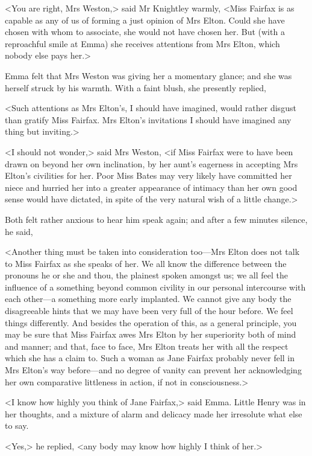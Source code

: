 <You are right, Mrs Weston,> said Mr Knightley warmly, <Miss Fairfax is as capable as any of us of forming a just opinion of Mrs Elton. Could she have chosen with whom to associate, she would not have chosen her. But (with a reproachful smile at Emma) she receives attentions from Mrs Elton, which nobody else pays her.>

Emma felt that Mrs Weston was giving her a momentary glance; and she was herself struck by his warmth. With a faint blush, she presently replied,

<Such attentions as Mrs Elton's, I should have imagined, would rather disgust than gratify Miss Fairfax. Mrs Elton's invitations I should have imagined any thing but inviting.>

<I should not wonder,> said Mrs Weston, <if Miss Fairfax were to have been drawn on beyond her own inclination, by her aunt's eagerness in accepting Mrs Elton's civilities for her. Poor Miss Bates may very likely have committed her niece and hurried her into a greater appearance of intimacy than her own good sense would have dictated, in spite of the very natural wish of a little change.>

Both felt rather anxious to hear him speak again; and after a few minutes silence, he said,

<Another thing must be taken into consideration too—Mrs Elton does not talk to Miss Fairfax as she speaks of her. We all know the difference between the pronouns he or she and thou, the plainest spoken amongst us; we all feel the influence of a something beyond common civility in our personal intercourse with each other—a something more early implanted. We cannot give any body the disagreeable hints that we may have been very full of the hour before. We feel things differently. And besides the operation of this, as a general principle, you may be sure that Miss Fairfax awes Mrs Elton by her superiority both of mind and manner; and that, face to face, Mrs Elton treats her with all the respect which she has a claim to. Such a woman as Jane Fairfax probably never fell in Mrs Elton's way before—and no degree of vanity can prevent her acknowledging her own comparative littleness in action, if not in consciousness.>

<I know how highly you think of Jane Fairfax,> said Emma. Little Henry was in her thoughts, and a mixture of alarm and delicacy made her irresolute what else to say.

<Yes,> he replied, <any body may know how highly I think of her.>

